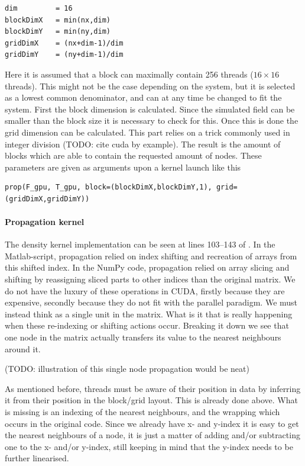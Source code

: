 \begin{verbatim}
dim         = 16
blockDimX   = min(nx,dim)
blockDimY   = min(ny,dim)
gridDimX    = (nx+dim-1)/dim
gridDimY    = (ny+dim-1)/dim
\end{verbatim}

Here it is assumed that a block can maximally contain 256 threads ($16\times16$ threads). This might not be the case depending on the system, but it is selected as a lowest common denominator, and can at any time be changed to fit the system. First the block dimension is calculated. Since the simulated field can be smaller than the block size it is necessary to check for this. Once this is done the grid dimension can be calculated. This part relies on a trick commonly used in integer division (TODO: cite cuda by example). The result is the amount of blocks which are able to contain the requested amount of nodes. These parameters are given as arguments upon a kernel launch like this

\begin{verbatim}
prop(F_gpu, T_gpu, block=(blockDimX,blockDimY,1), grid=(gridDimX,gridDimY))
\end{verbatim}


\paragraph{Propagation kernel} The density kernel implementation can be seen at lines 103--143 of . In the Matlab-script, propagation relied on index shifting and recreation of arrays from this shifted index. In the NumPy code, propagation relied on array slicing and shifting by reassigning sliced parts to other indices than the original matrix. We do not have the luxury of these operations in CUDA, firstly because they are expensive, secondly because they do not fit with the parallel paradigm. We must instead think as a single unit in the matrix. What is it that is really happening when these re-indexing or shifting actions occur. Breaking it down we see that one node in the matrix actually transfers its value to the nearest neighbours around it.

(TODO: illustration of this single node propagation would be neat)

As mentioned before, threads must be aware of their position in data by inferring it from their position in the block/grid layout. This is already done above. What is missing is an indexing of the nearest neighbours, and the wrapping which occurs in the original code. Since we already have x- and y-index it is easy to get the nearest neighbours of a node, it is just a matter of adding and/or subtracting one to the x- and/or y-index, still keeping in mind that the y-index needs to be further linearised.

